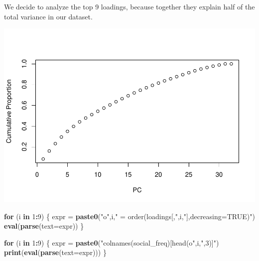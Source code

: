 \documentclass[]{article}
\newenvironment{Shaded}{\begin{snugshade}}{\end{snugshade}}
\newcommand{\ControlFlowTok}[1]{\textcolor[rgb]{0.13,0.29,0.53}{\textbf{#1}}}
\newcommand{\DataTypeTok}[1]{\textcolor[rgb]{0.13,0.29,0.53}{#1}}
\newcommand{\DecValTok}[1]{\textcolor[rgb]{0.00,0.00,0.81}{#1}}
\newcommand{\KeywordTok}[1]{\textcolor[rgb]{0.13,0.29,0.53}{\textbf{#1}}}
\newcommand{\NormalTok}[1]{#1}
\newcommand{\OperatorTok}[1]{\textcolor[rgb]{0.81,0.36,0.00}{\textbf{#1}}}
\newcommand{\OtherTok}[1]{\textcolor[rgb]{0.56,0.35,0.01}{#1}}
\newcommand{\StringTok}[1]{\textcolor[rgb]{0.31,0.60,0.02}{#1}}
\begin{document}
We decide to analyze the top 9 loadings, because together they explain
half of the total variance in our dataset.

\begin{Shaded}
\end{Shaded}

\includegraphics{STA380_exercise_George_files/figure-latex/unnamed-chunk-19-1.pdf}

\begin{Shaded}
\begin{Highlighting}[]
\ControlFlowTok{for}\NormalTok{ (i }\ControlFlowTok{in} \DecValTok{1}\OperatorTok{:}\DecValTok{9}\NormalTok{) \{}
\NormalTok{  expr =}\StringTok{ }\KeywordTok{paste0}\NormalTok{(}\StringTok{"o"}\NormalTok{,i,}\StringTok{" = order(loadings[,"}\NormalTok{,i,}\StringTok{"],decreasing=TRUE)"}\NormalTok{)}
  \KeywordTok{eval}\NormalTok{(}\KeywordTok{parse}\NormalTok{(}\DataTypeTok{text=}\NormalTok{expr))}
\NormalTok{\}}

\ControlFlowTok{for}\NormalTok{ (i }\ControlFlowTok{in} \DecValTok{1}\OperatorTok{:}\DecValTok{9}\NormalTok{) \{}
\NormalTok{  expr =}\StringTok{ }\KeywordTok{paste0}\NormalTok{(}\StringTok{"colnames(social_freq)[head(o"}\NormalTok{,i,}\StringTok{",3)]"}\NormalTok{)}
  \KeywordTok{print}\NormalTok{(}\KeywordTok{eval}\NormalTok{(}\KeywordTok{parse}\NormalTok{(}\DataTypeTok{text=}\NormalTok{expr)))}
\NormalTok{\}}
\end{Highlighting}
\end{Shaded}
\end{document}
